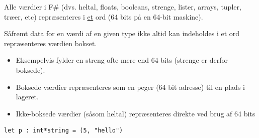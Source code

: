 \documentclass[rgb]{beamer}
\begin{document}
\begin{frame}[fragile]
\begin{small}


  Alle værdier i F\# (dvs. heltal, floats, booleans, strenge, lister, arrays,
  tupler, træer, etc) repræsenteres i \underline{et} ord (64 bits på en 64-bit maskine).

  \vspace{1ex}

  Såfremt data for en værdi af en given type ikke altid kan indeholdes i et ord repræsenteres værdien bokset.

  \vspace{1ex}
  \begin{itemize}
  \item Eksempelvis fylder en streng ofte mere end 64 bits (strenge er derfor boksede).
  \item Boksede værdier repræsenteres som en peger (64 bit adresse) til en plads i lageret.
  \item Ikke-boksede værdier (såsom heltal) repræsenteres direkte ved brug af 64 bits
  \end{itemize}


\begin{lstlisting}[numbers=none,frame=none,mathescape]
  let p : int*string = (5, "hello")
\end{lstlisting}

\end{small}
\end{frame}
\end{document}
